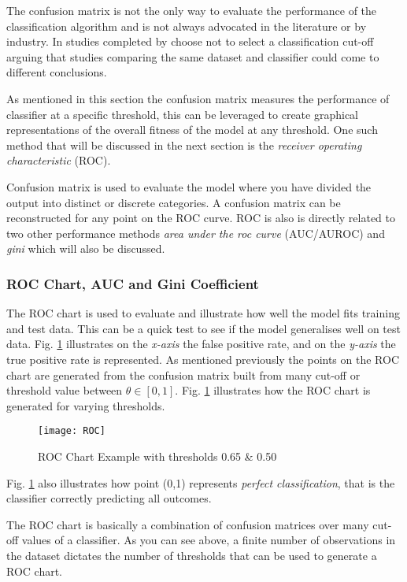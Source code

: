 The confusion matrix is not the only way to evaluate the performance of the classification algorithm and is not always advocated in the literature or by industry. In studies completed by \cite{lessmann_benchmarking_2008} choose not to select a classification cut-off arguing that studies comparing the same dataset and classifier could come to different conclusions.

As mentioned in this section the confusion matrix measures the performance of classifier at a specific threshold, this can be leveraged to create graphical representations of the overall fitness of the model at any threshold. One such method that will be discussed in the next section is the \textit{receiver operating characteristic} (ROC). 


Confusion matrix is used to evaluate the model where you have divided the output into distinct or discrete categories. A confusion matrix can be reconstructed for any point on the ROC curve. ROC is also is directly related to two other performance methods \textit{area under the roc curve} (AUC/AUROC) and \textit{gini} which will also be discussed.  

\subsubsection{ROC Chart, AUC and Gini Coefficient}
The ROC chart is used to evaluate and illustrate how well the model fits training and test data. This can be a quick test to see if the model generalises well on test data. Fig. \ref{fig:ROC} illustrates on the \textit{x-axis} the false positive rate, and on the \textit{y-axis} the true positive rate is represented. As mentioned previously the points on the ROC chart are generated from the confusion matrix built from many cut-off or threshold value between $\theta \in [0,1]$. Fig. \ref{fig:ROC} illustrates how the ROC chart is generated for varying thresholds. 

\begin{figure}[H]
	\texttt{[image: ROC]}
	\caption[ROC]
	{ROC Chart Example with thresholds 0.65 \& 0.50}
	\label{fig:ROC}
\end{figure}

Fig. \ref{fig:ROC} also illustrates how point (0,1) represents \textit{perfect classification}, that is the classifier correctly predicting all outcomes. 

The ROC chart is basically a combination of confusion matrices over many cut-off values of a classifier. As you can see above, a finite number of observations in the dataset dictates the number of thresholds that can be used to generate a ROC chart.

